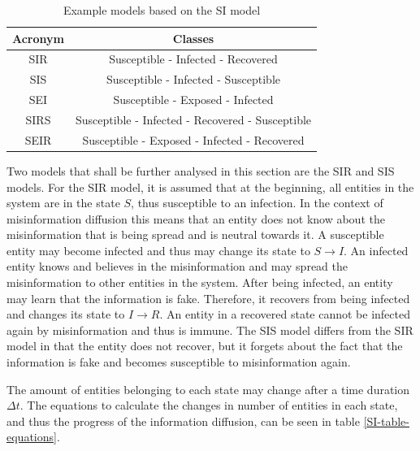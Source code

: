 \begin{table}[ht!]
    \centering
    \begin{tabular}{|c | c |} 
     \hline
     Acronym & Classes  \\ 
     \hline
     SIR & Susceptible - Infected - Recovered  \\ 
     \hline
     SIS & Susceptible - Infected - Susceptible \\
     \hline
     SEI & Susceptible - Exposed - Infected \\
     \hline
     SIRS & Susceptible - Infected - Recovered - Susceptible \\
     \hline
     SEIR & Susceptible - Exposed - Infected - Recovered \\
     \hline
    \end{tabular}
    \caption{Example models based on the SI 
    model  \cite{reviewinformationdiffusion}}
    \label{SI-table}
\end{table}

Two models that shall be further analysed in this section are the SIR and SIS models. 
For the SIR model, it is assumed that at the beginning, all entities in the 
system are in the state $S$, thus susceptible to an infection. In the context of 
misinformation diffusion this means that an entity does not know about the
misinformation that is being spread and is neutral towards it. A susceptible
entity may become infected and thus may change its state to $S\to I$.
An infected entity knows and believes in the misinformation and may
spread the misinformation to other entities in the system. After being infected,
an entity may learn that the information is fake. Therefore, it recovers 
from being infected and changes its state to $I\to R$. An entity in a 
recovered state cannot be infected again by misinformation and thus is immune.
The SIS model differs from the SIR model in that the entity does not recover,
but it \glqq forgets\grqq{} about the fact that the information is fake 
and becomes susceptible to misinformation again.

The amount of entities belonging to each state may change 
after a time duration $\Delta t$. The equations to calculate the 
changes in number of entities in each state, and thus the progress 
of the information diffusion, can be seen in table \ref{SI-table-equations}.

